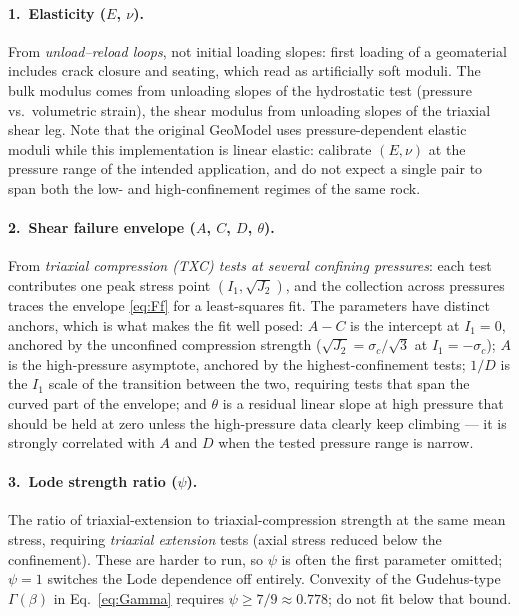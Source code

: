 \documentclass[12pt]{article}
\begin{document}
\paragraph{1.\ Elasticity ($E$, $\nu$).}
From \emph{unload--reload loops}, not initial loading slopes: first
loading of a geomaterial includes crack closure and seating, which
read as artificially soft moduli. The bulk modulus comes from
unloading slopes of the hydrostatic test (pressure vs.\ volumetric
strain), the shear modulus from unloading slopes of the triaxial
shear leg. Note that the original GeoModel uses pressure-dependent
elastic moduli while this implementation is linear elastic: calibrate
$(E,\nu)$ at the pressure range of the intended application, and do
not expect a single pair to span both the low- and high-confinement
regimes of the same rock.

\paragraph{2.\ Shear failure envelope ($A$, $C$, $D$, $\theta$).}
From \emph{triaxial compression (TXC) tests at several confining
pressures}: each test contributes one peak stress point
$(I_1, \sqrt{J_2})$, and the collection across pressures traces the
envelope \eqref{eq:Ff} for a least-squares fit. The parameters have
distinct anchors, which is what makes the fit well posed: $A - C$ is
the intercept at $I_1 = 0$, anchored by the unconfined compression
strength ($\sqrt{J_2} = \sigma_c/\sqrt{3}$ at $I_1 = -\sigma_c$);
$A$ is the high-pressure asymptote, anchored by the
highest-confinement tests; $1/D$ is the $I_1$ scale of the transition
between the two, requiring tests that span the curved part of the
envelope; and $\theta$ is a residual linear slope at high pressure
that should be held at zero unless the high-pressure data clearly
keep climbing --- it is strongly correlated with $A$ and $D$ when the
tested pressure range is narrow.

\paragraph{3.\ Lode strength ratio ($\psi$).}
The ratio of triaxial-extension to triaxial-compression strength at
the same mean stress, requiring \emph{triaxial extension} tests
(axial stress reduced below the confinement). These are harder to
run, so $\psi$ is often the first parameter omitted; $\psi = 1$
switches the Lode dependence off entirely. Convexity of the
Gudehus-type $\Gamma(\beta)$ in Eq.~\eqref{eq:Gamma} requires
$\psi \ge 7/9 \approx 0.778$; do not fit below that bound.
\end{document}
